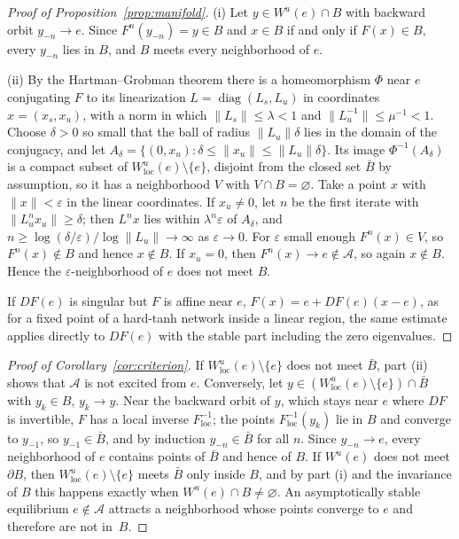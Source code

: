 \documentclass[aip,cha,reprint,amsmath,amssymb,longbibliography]{revtex4-2}
\theoremstyle{definition}
\begin{document}
\begin{proof}[Proof of Proposition~\ref{prop:manifold}]
(i) Let $y\in W^u(e)\cap B$ with backward orbit $y_{-n}\to e$. Since $F^n(y_{-n})=y\in B$ and $x\in B$ if and only if
$F(x)\in B$, every $y_{-n}$ lies in $B$, and $B$ meets every neighborhood of $e$.

(ii) By the Hartman--Grobman theorem\cite{Hartman1960Lemma,Grobman1959Homeo,KatokHasselblatt1995Intro} there is a
homeomorphism $\Phi$ near $e$ conjugating $F$ to its linearization $L=\operatorname{diag}(L_s,L_u)$ in coordinates
$x=(x_s,x_u)$, with a norm in which $\|L_s\|\le\lambda<1$ and $\|L_u^{-1}\|\le\mu^{-1}<1$. Choose $\delta>0$ so small that the
ball of radius $\|L_u\|\delta$ lies in the domain of the conjugacy, and let $A_\delta=\{(0,x_u):\delta\le\|x_u\|\le\|L_u\|\delta\}$.
Its image $\Phi^{-1}(A_\delta)$ is a compact subset of $W^u_{\mathrm{loc}}(e)\setminus\{e\}$, disjoint from the closed set
$\bar B$ by assumption, so it has a neighborhood $V$ with $V\cap B=\varnothing$. Take a point $x$ with $\|x\|<\varepsilon$ in the
linear coordinates. If $x_u\neq0$, let $n$ be the first iterate with $\|L_u^nx_u\|\ge\delta$; then $L^nx$ lies within
$\lambda^n\varepsilon$ of $A_\delta$, and $n\ge\log(\delta/\varepsilon)/\log\|L_u\|\to\infty$ as $\varepsilon\to0$. For
$\varepsilon$ small enough $F^n(x)\in V$, so $F^n(x)\notin B$ and hence $x\notin B$. If $x_u=0$, then $F^n(x)\to e\notin\mathcal{A}$,
so again $x\notin B$. Hence the $\varepsilon$-neighborhood of $e$ does not meet $B$.

If $DF(e)$ is singular but $F$ is affine near $e$, $F(x)=e+DF(e)(x-e)$, as for a fixed point of a hard-tanh network inside a
linear region, the same estimate applies directly to $DF(e)$ with the stable part including the zero eigenvalues.
\end{proof}

\begin{proof}[Proof of Corollary~\ref{cor:criterion}]
If $W^u_{\mathrm{loc}}(e)\setminus\{e\}$ does not meet $\bar B$, part (ii) shows that $\mathcal{A}$ is not excited from $e$.
Conversely, let $y\in(W^u_{\mathrm{loc}}(e)\setminus\{e\})\cap\bar B$ with $y_k\in B$, $y_k\to y$. Near the backward orbit of
$y$, which stays near $e$ where $DF$ is invertible, $F$ has a local inverse $F^{-1}_{\mathrm{loc}}$; the points
$F^{-1}_{\mathrm{loc}}(y_k)$ lie in $B$ and converge to $y_{-1}$, so $y_{-1}\in\bar B$, and by induction $y_{-n}\in\bar B$ for all
$n$. Since $y_{-n}\to e$, every neighborhood of $e$ contains points of $\bar B$ and hence of $B$. If $W^u(e)$ does not meet
$\partial B$, then $W^u_{\mathrm{loc}}(e)\setminus\{e\}$ meets $\bar B$ only inside $B$, and by part (i) and the invariance of
$B$ this happens exactly when $W^u(e)\cap B\neq\varnothing$. An asymptotically stable equilibrium $e\notin\mathcal{A}$ attracts a
neighborhood whose points converge to $e$ and therefore are not in~$B$.
\end{proof}
\end{document}
